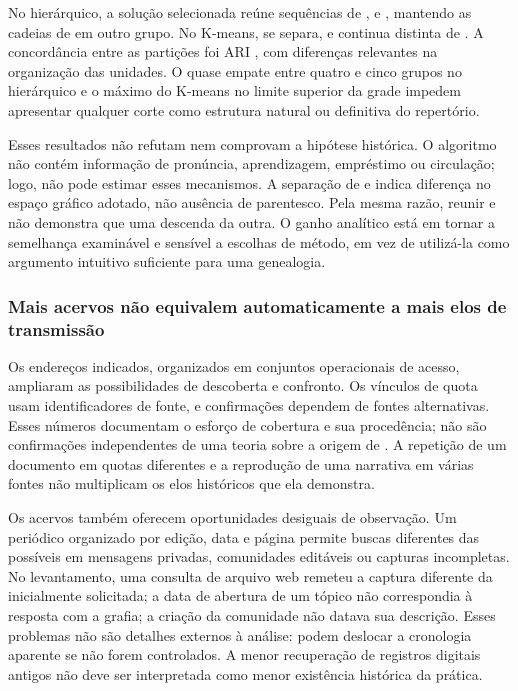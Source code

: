 No hierárquico, a solução selecionada reúne sequências de ,  e , mantendo as cadeias de  em outro grupo. No K-means,  se separa, e  continua distinta de . A concordância entre as partições foi ARI \MethodsARI{}, com diferenças relevantes na organização das unidades. O quase empate entre quatro e cinco grupos no hierárquico e o máximo do K-means no limite superior da grade impedem apresentar qualquer corte como estrutura natural ou definitiva do repertório.

Esses resultados não refutam nem comprovam a hipótese histórica. O algoritmo não contém informação de pronúncia, aprendizagem, empréstimo ou circulação; logo, não pode estimar esses mecanismos. A separação de  e  indica diferença no espaço gráfico adotado, não ausência de parentesco. Pela mesma razão, reunir  e  não demonstra que uma descenda da outra. O ganho analítico está em tornar a semelhança examinável e sensível a escolhas de método, em vez de utilizá-la como argumento intuitivo suficiente para uma genealogia.

\subsubsection{Mais acervos não equivalem automaticamente a mais elos de transmissão}
Os \RequestedAddresses{} endereços indicados, organizados em \ResourceGroups{} conjuntos operacionais de acesso, ampliaram as possibilidades de descoberta e confronto. Os \ArchiveLinkCount{} vínculos de quota usam \ArchiveSourceCount{} identificadores de fonte, e \ArchiveAlternative{} confirmações dependem de fontes alternativas. Esses números documentam o esforço de cobertura e sua procedência; não são \ArchiveLinkCount{} confirmações independentes de uma teoria sobre a origem de . A repetição de um documento em quotas diferentes e a reprodução de uma narrativa em várias fontes não multiplicam os elos históricos que ela demonstra.

Os acervos também oferecem oportunidades desiguais de observação. Um periódico organizado por edição, data e página permite buscas diferentes das possíveis em mensagens privadas, comunidades editáveis ou capturas incompletas. No levantamento, uma consulta de arquivo web remeteu a captura diferente da inicialmente solicitada; a data de abertura de um tópico não correspondia à resposta com a grafia; a criação da comunidade não datava sua descrição. Esses problemas não são detalhes externos à análise: podem deslocar a cronologia aparente se não forem controlados. A menor recuperação de registros digitais antigos não deve ser interpretada como menor existência histórica da prática.

